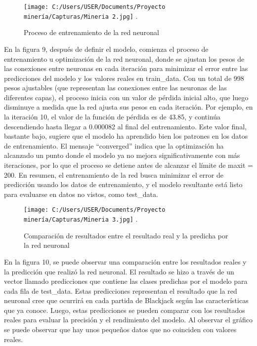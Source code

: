 \documentclass[conference,final,]{IEEEtran}
\begin{document}
\begin{figure}[htbp]
\centering
\texttt{[image: C:/Users/USER/Documents/Proyecto minería/Capturas/Mineria 2.jpg]}
\DeclareGraphicsExtensions.
\caption{Proceso de entrenamiento de la red neuronal}
\label{Mineria 2}
\end{figure}

En la figura 9, después de definir el modelo, comienza el proceso de
entrenamiento u optimización de la red neuronal, donde se ajustan los
pesos de las conexiones entre neuronas en cada iteración para minimizar
el error entre las predicciones del modelo y los valores reales en
train\_data. Con un total de 998 pesos ajustables (que representan las
conexiones entre las neuronas de las diferentes capas), el proceso
inicia con un valor de pérdida inicial alto, que luego disminuye a
medida que la red ajusta sus pesos en cada iteración. Por ejemplo, en la
iteración 10, el valor de la función de pérdida es de 43.85, y continúa
descendiendo hasta llegar a 0.000082 al final del entrenamiento. Este
valor final, bastante bajo, sugiere que el modelo ha aprendido bien los
patrones en los datos de entrenamiento. El mensaje ``converged'' indica
que la optimización ha alcanzado un punto donde el modelo ya no mejora
significativamente con más iteraciones, por lo que el proceso se detiene
antes de alcanzar el límite de maxit = 200. En resumen, el entrenamiento
de la red busca minimizar el error de predicción usando los datos de
entrenamiento, y el modelo resultante está listo para evaluarse en datos
no vistos, como test\_data.

\begin{figure}[htbp]
\centering
\texttt{[image: C:/Users/USER/Documents/Proyecto minería/Capturas/Mineria 3.jpg]}
\DeclareGraphicsExtensions.
\caption{Comparación de resultados entre el resultado real y la predicha por la red neuronal}
\label{Mineria 3}
\end{figure}

En la figura 10, se puede observar una comparación entre los resultados
reales y la predicción que realizó la red neuronal. El resultado se hizo
a través de un vector llamado predicciones que contiene las clases
predichas por el modelo para cada fila de test\_data. Estas predicciones
representan el resultado que la red neuronal cree que ocurrirá en cada
partida de Blackjack según las características que ya conoce. Luego,
estas predicciones se pueden comparar con los resultados reales para
evaluar la precisión y el rendimiento del modelo. Al observar el gráfico
se puede observar que hay unos pequeños datos que no coinciden con
valores reales.
\end{document}
